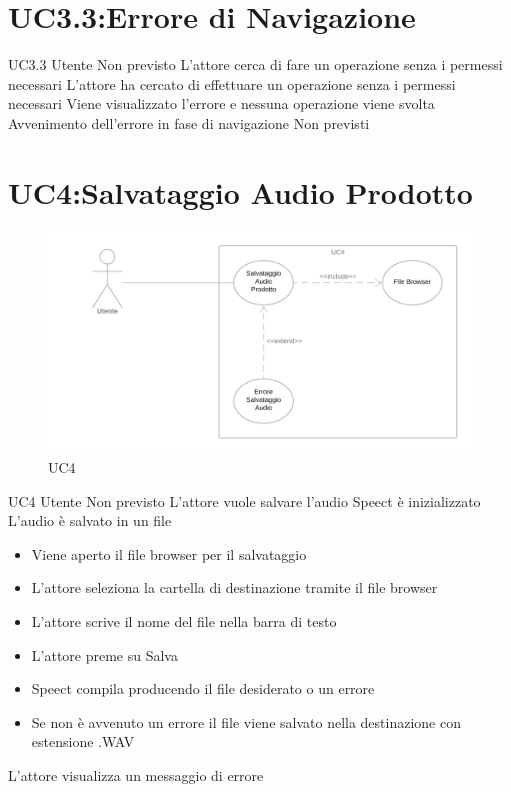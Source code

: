 \documentclass[../AnalisideiRequisiti.tex]{subfiles}
\begin{document}
\section{UC3.3:Errore di Navigazione}
\UserCase
{UC3.3}
{Utente}
{Non previsto}
{L'attore cerca di fare un operazione senza i permessi necessari}
{L'attore ha cercato di effettuare un operazione senza i permessi necessari}
{Viene visualizzato l'errore e nessuna operazione viene svolta}
{Avvenimento dell'errore in fase di navigazione}
{Non previsti}

\section{UC4:Salvataggio Audio Prodotto}
\begin{figure}[H]
	\caption{UC4}
	\centering
	\includegraphics[width=\textwidth]{../img/UC04.png}
\end{figure}
\UserCase
{UC4}
{Utente}
{Non previsto}
{L'attore vuole salvare l'audio}
{Speect è inizializzato }
{L'audio è salvato in un file}
{
		\begin{itemize}
		\item{} Viene aperto il file browser per il salvataggio 
		\item{} L'attore seleziona la cartella di destinazione tramite il file browser 
		\item{} L'attore scrive il nome del file nella barra di testo
		\item{} L'attore preme su Salva 
		\item{} Speect compila producendo il file desiderato o un errore  
		\item{} Se non è avvenuto un errore il file viene salvato nella destinazione con estensione .WAV
		\end{itemize}
}
{L'attore visualizza un messaggio di errore }		
\end{document}
